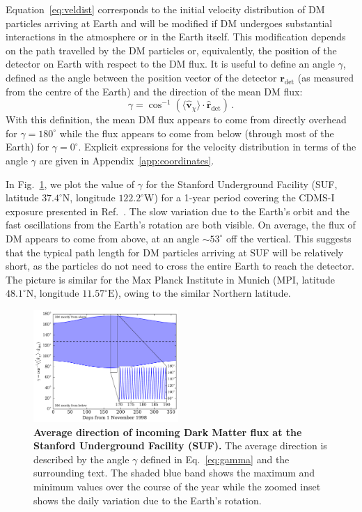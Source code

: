 \documentclass[prd,twocolumn,showpacs,nofootinbib,aps]{revtex4-1}
\begin{document}
Equation~\eqref{eq:veldist} corresponds to the initial velocity distribution of DM particles arriving at Earth and will be modified if DM undergoes substantial interactions in the atmosphere or in the Earth itself. This modification depends on the path travelled by the DM particles or, equivalently, the position of the detector on Earth with respect to the DM flux. It is useful to define an angle $\gamma$, defined as the angle between the position vector of the detector $\mathbf{r}_\mathrm{det}$ (as measured from the centre of the Earth) and the direction of the mean DM flux:
\begin{equation}
\label{eq:gamma}
\gamma = \cos^{-1}\left(\langle \hat{\mathbf{v}}_\chi\rangle \cdot \hat{\mathbf{r}}_\mathrm{det}\right)\,.
\end{equation}
With this definition, the mean DM flux appears to come from directly overhead for $\gamma = 180^\circ$ while the flux appears to come from below (through most of the Earth) for $\gamma = 0^\circ$. Explicit expressions for the velocity distribution in terms of the angle $\gamma$ are given in Appendix~\ref{app:coordinates}.

In Fig.~\ref{fig:gamma}, we plot the value of $\gamma$ for the Stanford Underground Facility (SUF, latitude $37.4^\circ \mathrm{N}$, longitude $122.2^\circ \mathrm{W}$) for a 1-year period covering the CDMS-I exposure presented in Ref.~\cite{Abusaidi:2000wg,Abrams:2002nb}. The slow variation due to the Earth's orbit and the fast oscillations from the Earth's rotation are both visible. On average, the flux of DM appears to come from above, at an angle $\sim 53^\circ$ off the vertical. This suggests that the typical path length for DM particles arriving at SUF will be relatively short, as the particles do not need to cross the entire Earth to reach the detector. The picture is similar for the Max Planck Institute in Munich (MPI, latitude $48.1^\circ \mathrm{N}$, longitude $11.57^\circ \mathrm{E}$), owing to the similar Northern latitude.

\begin{figure}[t]
\centering
\includegraphics[width=0.49\textwidth,]{plots/Gamma_SUF.pdf}
\caption{\textbf{Average direction of incoming Dark Matter flux at the Stanford Underground Facility (SUF).}  The average direction is described by the angle $\gamma$ defined in Eq.~\eqref{eq:gamma} and the surrounding text. The shaded blue band shows the maximum and minimum values over the course of the year while the zoomed inset shows the daily variation due to the Earth's rotation.}
\label{fig:gamma}
\end{figure}
\end{document}
